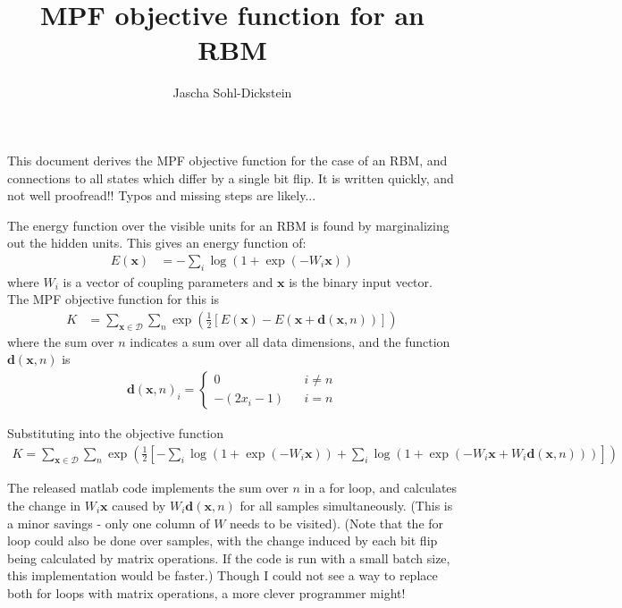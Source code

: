 \documentclass{article}
\title{MPF objective function for an RBM}
\author{
Jascha Sohl-Dickstein
}
\newcommand{\mb}{\mathbf}
\begin{document}
\maketitle

This document derives the MPF objective function for the case of an RBM, and connections to all states which differ by a single bit flip.  It is written quickly, and not well proofread!!  Typos and missing steps are likely...

The energy function over the visible
units for an RBM is found by marginalizing out the hidden units.  This
gives an energy function of:
\begin{align}
E(\mb x) &= -\sum_i \log ( 1 + \exp ( -W_i \mb x ) )
\end{align}
where $W_i$ is a vector of coupling parameters and $\mb x$ is the binary input
vector.  The MPF objective function for this is
\begin{align}
K &= \sum_{\mb x \in \mathcal D} \sum_n \exp\left( \frac{1}{2}\left[
E(\mb x) - E(\mb x + {\mb d}(\mb x, n)) \right] \right)
\end{align}
where the sum over $n$ indicates a sum over all data dimensions, and
the function ${\mb d}(\mb x, n)$ is
\begin{align}
{\mb d}(\mb x, n)_i =
	\left\{\begin{array}{ccc}
0 & & i \neq n \\
-(2 x_i - 1) & & i = n
	\end{array}\right.
\end{align}

Substituting into the objective function
\begin{align}
K = \sum_{\mb x \in \mathcal D} \sum_n \exp\left( \frac{1}{2}\left[
-\sum_i \log ( 1 + \exp ( -W_i \mb x ) )
+
\sum_i \log ( 1 + \exp ( -W_i \mb x + W_i {\mb d}(\mb x, n)  ) )
\right] \right)
\end{align}

The released matlab code implements the sum over $n$ in a for loop, and
calculates the change in $W_i \mb x$ caused by $W_i {\mb d}( \mb x, n)$ for all samples simultaneously.  (This is a minor savings - only one column of $W$ needs to be visited).  (Note that the for loop could also
be done over samples, with the change induced by each bit flip being
calculated by matrix operations.  If the code is run with a small
batch size, this implementation would be faster.)  Though I could not
see a way to replace both for loops with matrix operations, a more
clever programmer might!
		
\end{document}
